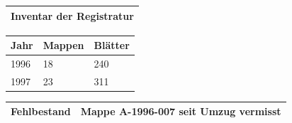 \documentclass[11pt,a4paper]{article}
\begin{document}
\begin{table}[h]
\begin{tabular}{|l|}
\hline
Inventar der Registratur \\ \hline
\end{tabular}
\end{table}

\begin{table}[h]
\begin{tabular}{|l|l|l|}
\hline
Jahr & Mappen & Blätter \\ \hline
1996 & 18 & 240 \\ \hline
1997 & 23 & 311 \\ \hline
\end{tabular}
\end{table}

\begin{table}[h]
\begin{tabular}{|l|l|}
\hline
Fehlbestand & Mappe A-1996-007 seit Umzug vermisst \\ \hline
\end{tabular}
\end{table}
\end{document}

